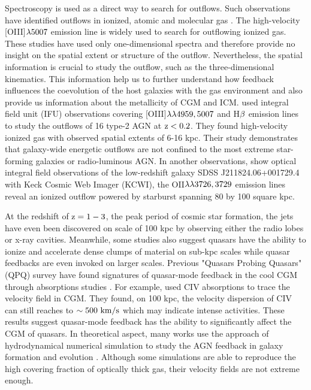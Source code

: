 \documentclass[../main.tex]{subfiles}
\begin{document}
Spectroscopy is used as a direct way to search for outflows. Such observations have identified outflows in ionized, atomic and molecular gas \citep{nesvadba2008evidence}. The high-velocity [OIII]$\rm \lambda5007$ emission line is widely used to search for outflowing ionized gas. These studies have used only one-dimensional spectra and therefore provide no insight on the spatial extent or structure of the outflow. Nevertheless, the spatial information is crucial to study the outflow, such as the three-dimensional kinematics. This information help us to further understand how feedback influences the coevolution of the host galaxies with the gas environment and also provide us information about the metallicity of CGM and ICM. \citet{harrison2014kiloparsec} used integral field unit (IFU) observations covering [OIII]$\rm \lambda \lambda 4959,5007$ and H$\rm \beta$ emission lines to study the outflows of 16 type-2 AGN at $\rm z<0.2$. They found high-velocity ionized gas with observed spatial extents of 6-16 kpc. Their study demonstrates that galaxy-wide energetic outflows are not confined to the most extreme star-forming galaxies or radio-luminous AGN. In another observations, \citet{rupke2019100} show optical integral field observations of the low-redshift galaxy SDSS J211824.06+001729.4 with Keck Cosmic Web Imager (KCWI), the OII$\rm \lambda \lambda 3726,3729$ emission lines reveal an ionized outflow powered by starburst spanning 80 by 100 square kpc. 

At the redshift of $\rm z=1-3$, the peak period of cosmic star formation, the jets have even been discovered on scale of 100 kpc by observing either the radio lobes or x-ray cavities. Meanwhile, some studies also suggest quasars have the ability to ionize and accelerate dense clumps of material on sub-kpc scales while quasar feedbacks are even invoked on larger scales. Previous "Quasars Probing Quasars" (QPQ) survey have found signatures of quasar-mode feedback in the cool CGM through absorptions studies \citep{Prochaska_2013,Hennawi_2013,Lau_2016}. For example, \citet{Lau_2016} used CIV absorptions to trace the velocity field in CGM. They found, on 100 kpc, the velocity dispersion of CIV can still reaches to $\rm \sim 500 \ km/s$ which may indicate intense activities. These results suggest quasar-mode feedback has the ability to significantly affect the CGM of quasars. In theoretical aspect, many works use the approach of hydrodynamical numerical simulation to study the AGN feedback in galaxy formation and evolution \citep{Springel_2005,Di_Matteo_2005,Ciotti_2007,Sijacki_2007,Booth_2009,Ostriker_2010,Hirschmann_2014,Ciotti_2017}. Although some simulations \citep{Faucher_Gigu_re_2016} are able to reproduce the high covering fraction of optically thick gas, their velocity fields are not extreme enough.
\end{document}
